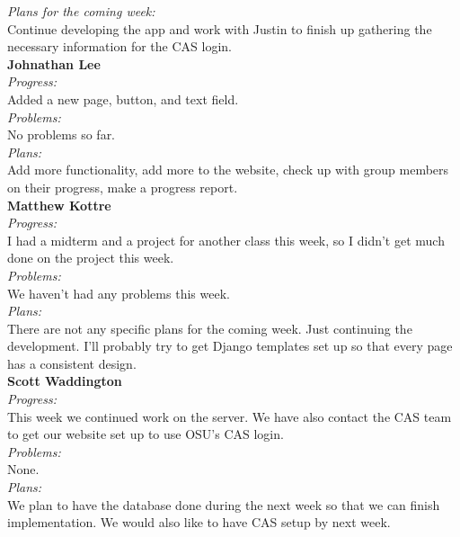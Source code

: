 \noindent\textit{Plans for the coming week:}\\
\noindent Continue developing the app and work with Justin to finish up gathering the necessary information for the CAS login. \\

\noindent\textbf{Johnathan Lee}\\
\noindent\textit{Progress:}\\
Added a new page, button, and text field. \\ 

\noindent\textit{Problems:}\\
\noindent No problems so far.\\

\noindent\textit{Plans:}\\
\noindent Add more functionality, add more to the website, check up with group members on their progress, make a progress report.\\

\noindent\textbf{Matthew Kottre}\\
\noindent\textit{Progress:}\\
I had a midterm and a project for another class this week, so I didn't get much done on the project this week.\\

\noindent\textit{Problems:}\\
\noindent We haven't had any problems this week.\\

\noindent\textit{Plans:}\\
\noindent There are not any specific plans for the coming week. Just continuing the development. I'll probably try to get Django templates set up so that every page has a consistent design.\\

\noindent\textbf{Scott Waddington}\\
\noindent\textit{Progress:}\\
This week we continued work on the server. We have also contact the CAS team to get our website set up to use OSU's CAS login.\\

\noindent\textit{Problems:}\\
\noindent None.\\

\noindent\textit{Plans:}\\
\noindent We plan to have the database done during the next week so that we can finish implementation. We would also like to have CAS setup by next week.\\


